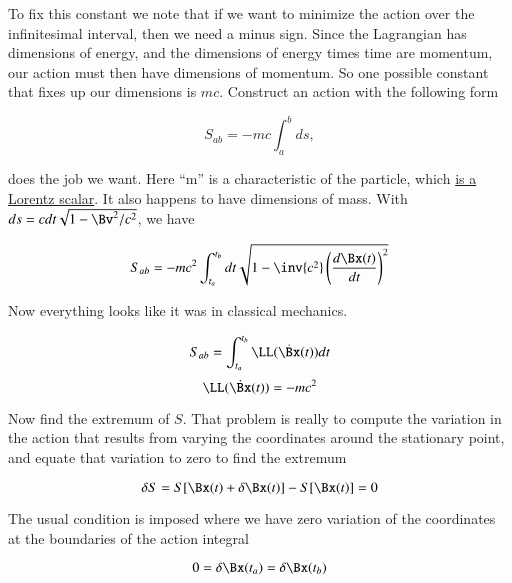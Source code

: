 To fix this constant we note that if we want to minimize the action over the infinitesimal interval, then we need a minus sign.  Since the Lagrangian has dimensions of energy, and the dimensions of energy times time are momentum, our action must then have dimensions of momentum.  So one possible constant that fixes up our dimensions is $mc$.  Construct an action with the following form

\begin{equation}\label{eqn:relativisticElectrodynamicsL7:190}
S_{ab} = - m c\int_a^b ds,
\end{equation}

does the job we want.  Here ``m'' is a characteristic of the particle, which \underline{is a Lorentz scalar}.  It also happens to have dimensions of mass.  With $ds = c dt \sqrt{1 - \Bv^2/c^2}$, we have

\begin{equation}\label{eqn:relativisticElectrodynamicsL7:200}
S_{ab} = - m c^2 \int_{t_a}^{t_b} dt \sqrt{ 1 - \inv{c^2} \left( \frac{d \Bx(t) }{dt} \right)^2 }
\end{equation}

Now everything looks like it was in classical mechanics.

\begin{equation}\label{eqn:relativisticElectrodynamicsL7:210}
S_{ab} = \int_{t_a}^{t_b} \LL(\dot{\Bx}(t)) dt
\end{equation}
\begin{equation}\label{eqn:relativisticElectrodynamicsL7:220}
\LL(\dot{\Bx}(t)) = -m c^2 
\end{equation}

Now find the extremum of $S$.  That problem is really to compute the variation in the action that results from varying the coordinates around the stationary point, and equate that variation to zero to find the extremum

\begin{equation}\label{eqn:relativisticElectrodynamicsL7:230}
\delta S = S[\Bx(t) + \delta \Bx(t)] - S[ \Bx(t) ] = 0
\end{equation}

The usual condition is imposed where we have zero variation of the coordinates at the boundaries of the action integral

\begin{equation}\label{eqn:relativisticElectrodynamicsL7:231}
0 = \delta \Bx(t_a) = \delta \Bx(t_b) 
\end{equation}

